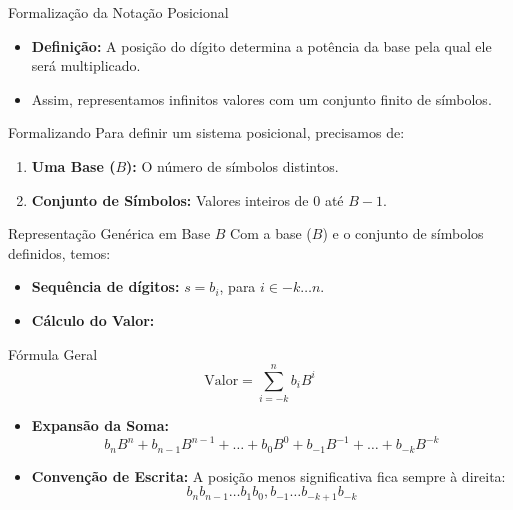 \begin{frame}{Formalização da Notação Posicional}
    \begin{itemize}
        \item \textbf{Definição:} A posição do dígito determina a potência da base pela qual ele será multiplicado.
        \item Assim, representamos infinitos valores com um conjunto finito de símbolos.
    \end{itemize}

    \begin{block}{Formalizando}
        Para definir um sistema posicional, precisamos de:
        \begin{enumerate}
            \item \textbf{Uma Base ($B$):} O número de símbolos distintos.
            \item \textbf{Conjunto de Símbolos:} Valores inteiros de $0$ até $B-1$.
        \end{enumerate}
    \end{block}



\end{frame}



\begin{frame}{Representação Genérica em Base $B$}
    Com a base ($B$) e o conjunto de símbolos definidos, temos:

    \begin{itemize}
        \item \textbf{Sequência de dígitos:} $s = b_i$, para $i \in -k \dots n$.
        \item \textbf{Cálculo do Valor:}
    \end{itemize}

    \begin{block}{Fórmula Geral}
        $$ \text{Valor} = \sum_{i=-k}^{n} b_i B^i $$
    \end{block}

    \begin{itemize}
        \item \textbf{Expansão da Soma:}
              {\small
                  $$ b_n B^n + b_{n-1} B^{n-1} + \dots + b_0 B^0 + b_{-1} B^{-1} + \dots + b_{-k} B^{-k} $$
              }
        \item \textbf{Convenção de Escrita:} A posição menos significativa fica sempre à direita:
              $$ b_n b_{n-1} \dots b_1 b_0 , b_{-1} \dots b_{-k+1} b_{-k} $$
    \end{itemize}
\end{frame}

